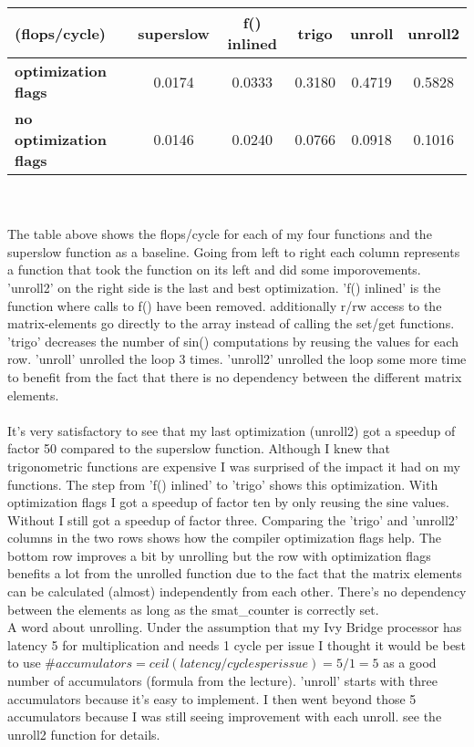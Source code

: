 \documentclass[10pt,a4paper,oneside,notitlepage]{report}
\begin{document}
\begin{tabular}{|l|c|c|c|c|c|}
\hline 
\rowcolor{gray!30} 
 (flops/cycle) & \textbf{superslow} & \textbf{f() inlined} & \textbf{trigo} & \textbf{unroll} & \textbf{unroll2} \\ 
\hline 
\cellcolor{gray!30} \textbf{optimization flags} & 0.0174 & 0.0333 & 0.3180 & 0.4719 & 0.5828 \\ 
\hline 
\cellcolor{gray!30} \textbf{no optimization flags} & 0.0146 & 0.0240 & 0.0766 & 0.0918 & 0.1016 \\ 
\hline 
\end{tabular}  \\ \\
The table above shows the flops/cycle for each of my four functions and the superslow function as a baseline. Going from left to right each column represents a function that took the function on its left and did some imporovements. 'unroll2' on the right side is the last and best optimization. 'f() inlined' is the function where calls to f() have been removed. additionally r/rw access to the matrix-elements go directly to the array instead of calling the set/get functions. 'trigo' decreases the number of sin() computations by reusing the values for each row. 'unroll' unrolled the loop 3 times. 'unroll2' unrolled the loop some more time to benefit from the fact that there is no dependency between the different matrix elements.
\\ \\
It's very satisfactory to see that my last optimization (unroll2) got a speedup of factor 50 compared to the superslow function. Although I knew that trigonometric functions are expensive I was surprised of the impact it had on my functions.  The step from 'f() inlined' to 'trigo' shows this optimization. With optimization flags I got a speedup of factor ten by only reusing the sine values. Without I still got a speedup of factor three. Comparing the 'trigo' and 'unroll2' columns in the two rows shows how the compiler optimization flags help. The bottom row improves a bit by unrolling but the row with optimization flags benefits a lot from the unrolled function due to the fact that the matrix elements can be calculated  (almost) independently from each other. There's no dependency between the elements as long as the  smat\_counter is correctly set. \\

A word about unrolling. Under the assumption that my Ivy Bridge processor has latency 5 for multiplication and needs 1 cycle per issue I thought it would be best to use $\#accumulators = ceil(latency/cycles per issue) = 5 / 1 = 5$ as a good number of accumulators (formula from the lecture). 'unroll' starts with three accumulators because it's easy to implement. I then went beyond those 5 accumulators because I was still seeing improvement with each unroll. see the unroll2 function for details.
\end{document}
